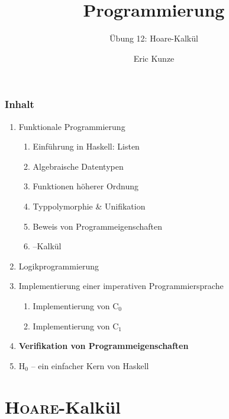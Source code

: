 \documentclass{beamer}
\begin{document}
	
	\title{Programmierung}
	\subtitle{Übung 12: Hoare-Kalkül}
	\author{Eric Kunze}
	\date{}
	
	\maketitle
	


\begin{frame}[fragile] \frametitle{Inhalt}
	\begin{enumerate}
		\item Funktionale Programmierung
		\begin{enumerate}
			\item Einführung in Haskell: Listen
			\item Algebraische Datentypen
			\item Funktionen höherer Ordnung
			\item Typpolymorphie \& Unifikation
			\item Beweis von Programmeigenschaften
			\item \textlambda--Kalkül
		\end{enumerate}
		\item Logikprogrammierung
		\item Implementierung einer imperativen Programmiersprache
		\begin{enumerate}
			\item Implementierung von C${}_\text{0}$
			\item Implementierung von C${}_\text{1}$
		\end{enumerate}
		\item \textbf{Verifikation von Programmeigenschaften}
		\item H${}_\text{0}$ -- ein einfacher Kern von Haskell
	\end{enumerate}
\end{frame}



\section{\textsc{Hoare}-Kalkül}
\end{document}
